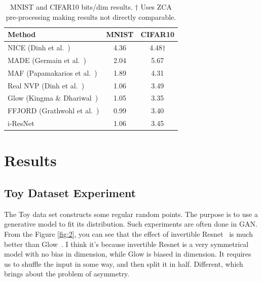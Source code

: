 \documentclass[final]{cvpr}
\begin{document}
\begin{table}[]
   \caption{MNIST and CIFAR10 bits/dim results. $†$ Uses ZCA pre-processing making results not directly comparable.}
   \label{table2}
   \begin{center}
      \begin{tabular}{@{}lcc@{}}
         \toprule
         Method                          & MNIST & CIFAR10 \\ \midrule
         NICE (Dinh et al.~\cite{dinh2014nice})        & 4.36  & 4.48$†$ \\
         MADE (Germain et al.~\cite{germain2015made})     & 2.04  & 5.67    \\
         MAF (Papamakarios et al.~\cite{papamakarios2017masked}) & 1.89  & 4.31    \\
         Real NVP (Dinh et al.~\cite{dinh2016density})    & 1.06  & 3.49    \\
         Glow (Kingma \& Dhariwal~\cite{kingma2018glow}) & 1.05  & 3.35    \\
         FFJORD (Grathwohl et al.~\cite{grathwohl2019scalable}) & 0.99  & 3.40    \\ \midrule
         i-ResNet~\cite{behrmann2019invertible} & 1.06  & 3.45    \\ \bottomrule
         \end{tabular}
   \end{center}
\end{table}


\section{Results}

\subsection{Toy Dataset Experiment}
The Toy data set constructs some regular random points. The purpose is to use a generative model to fit its distribution. Such experiments are often done in GAN. From the Figure \ref{fig:2}, you can see that the effect of invertible Resnet~\cite{behrmann2019invertible} is much better than Glow~\cite{kingma2018glow}. I think it’s because invertible Resnet is a very symmetrical model with no bias in dimension, while Glow is biased in dimension. It requires us to shuffle the input in some way, and then split it in half. Different, which brings about the problem of asymmetry.
\end{document}
